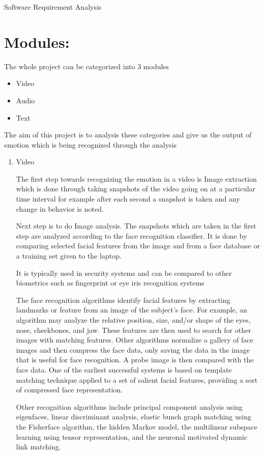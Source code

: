 \begin{center}
	{\Huge Software Requirement Analysis}
\end{center}
\setcounter{section}{0}
\section{Modules:}
The whole project can be categorized into 3 modules
\begin{itemize}
	\item Video
	\item Audio
	\item Text
\end{itemize}
The aim of this project is to analysis these categories and give us the output of emotion which is being recognized through the analysis

\begin{enumerate}
	\item Video
	
	The first step towards recognizing the emotion in a video is Image extraction which is done through taking snapshots of the video going on at a particular time interval for example after each second a snapshot is taken and any change in behavior is noted.
	
	Next step is to do Image analysis. The snapshots which are taken in the first step are analyzed according to the face recognition classifier. It is done by comparing selected facial features from the image and from a face database or a training set given to the laptop.
	
	It is typically used in security systems and can be compared to other biometrics such as fingerprint or eye iris recognition systems
	
	The face recognition algorithms identify facial features by extracting landmarks or feature from an image of the subject's face. For example, an algorithm may analyze the relative position, size, and/or shape of the eyes, nose, cheekbones, and jaw. These features are then used to search for other images with matching features. Other algorithms normalize a gallery of face images and then compress the face data, only saving the data in the image that is useful for face recognition. A probe image is then compared with the face data. One of the earliest successful systems is based on template matching technique applied to a set of salient facial features, providing a sort of compressed face representation.
	
	Other recognition algorithms include principal component analysis using eigenfaces, linear discriminant analysis, elastic bunch graph matching using the Fisherface algorithm, the hidden Markov model, the multilinear subspace learning using tensor representation, and the neuronal motivated dynamic link matching.
	

\end{enumerate}
